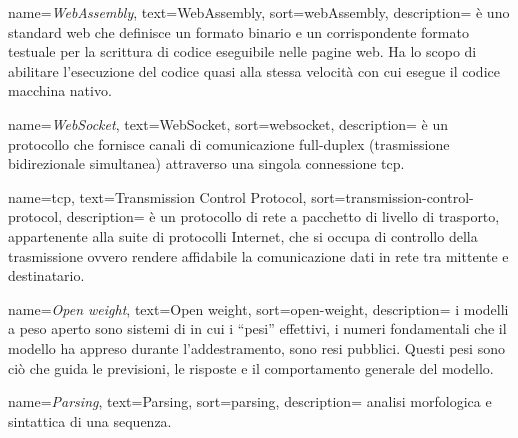  {
    name=\textit{WebAssembly},
    text=WebAssembly,
    sort=webAssembly,
    description={ è uno standard web che definisce un formato binario e un corrispondente formato testuale per la scrittura di codice eseguibile nelle pagine web. Ha lo scopo di abilitare l'esecuzione del codice quasi alla stessa velocità con cui esegue il codice macchina nativo. \\
    \cite{site:webassembly-wiki}
    }
}

 {
    name=\textit{WebSocket},
    text=WebSocket,
    sort=websocket,
    description={ è un protocollo che fornisce canali di comunicazione full-duplex (trasmissione bidirezionale simultanea) attraverso una singola connessione \acrshort{tcp}. \\
    \cite{site:websocket-wiki}
    }
}

 {
    name=\acrshort{tcp},
    text=Transmission Control Protocol,
    sort=transmission-control-protocol,
    description={ è un protocollo di rete a pacchetto di livello di trasporto, appartenente alla suite di protocolli Internet, che si occupa di controllo della trasmissione ovvero rendere affidabile la comunicazione dati in rete tra mittente e destinatario. \\
    \cite{site:tcp-wiki}
    }
}

 {
    name=\textit{Open weight},
    text=Open weight,
    sort=open-weight,
    description={ i modelli a peso aperto sono sistemi di  in cui i “pesi” effettivi, i numeri fondamentali che il modello ha appreso durante l’addestramento, sono resi pubblici. Questi pesi sono ciò che guida le previsioni, le risposte e il comportamento generale del modello. \\
    \cite{site:open_weight-invezz}
    }
}

 {
    name=\textit{Parsing},
    text=Parsing,
    sort=parsing,
    description={ analisi morfologica e sintattica di una sequenza. \\
    \cite{site:parsing-treccani}
    }
}